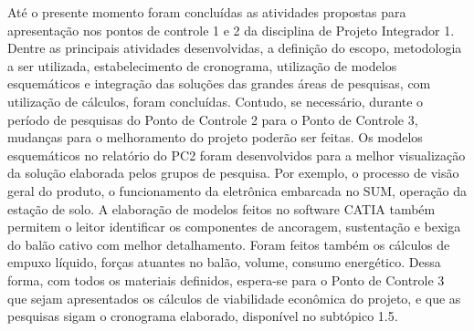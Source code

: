 Até o presente momento foram concluídas as atividades propostas para apresentação nos pontos de controle 1 e 2 da disciplina de Projeto Integrador 1. Dentre as principais atividades desenvolvidas, a definição do escopo, metodologia a ser utilizada, estabelecimento de cronograma, utilização de modelos esquemáticos e integração das soluções das grandes áreas de pesquisas, com utilização de cálculos, foram concluídas. Contudo, se necessário, durante o período de pesquisas do Ponto de Controle 2 para o Ponto de Controle 3, mudanças para o melhoramento do projeto poderão ser feitas.
Os modelos esquemáticos no relatório do PC2 foram desenvolvidos para a melhor visualização da solução elaborada pelos grupos de pesquisa. Por exemplo, o processo de visão geral do produto, o funcionamento da eletrônica embarcada no SUM,  operação da estação de solo. A elaboração de modelos feitos no software CATIA também permitem o leitor identificar os componentes de ancoragem, sustentação e bexiga do balão cativo com melhor detalhamento. Foram feitos também os cálculos de empuxo líquido, forças atuantes no balão, volume, consumo energético.
Dessa forma, com todos os materiais definidos, espera-se para o Ponto de Controle 3 que sejam apresentados os cálculos de viabilidade econômica do projeto, e que as pesquisas sigam o cronograma elaborado, disponível no subtópico 1.5.